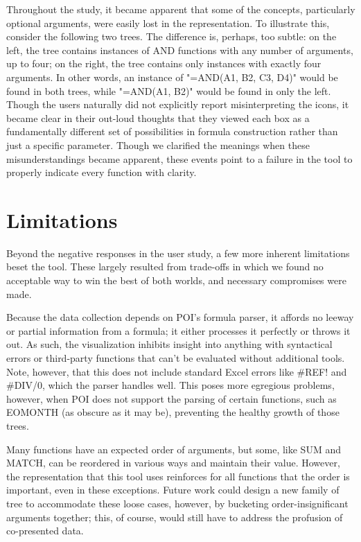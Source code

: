 \documentclass[conference]{IEEEtran}
\begin{document}
	Throughout the study, it became apparent that some of the concepts,
	particularly optional arguments, were easily lost in the representation. To
	illustrate this, consider the following two trees.	
	The difference is, perhaps, too subtle: on the left, the tree contains
	instances of AND functions with any number of arguments, up to four; on the
	right, the tree contains only instances with exactly four arguments. In other
	words, an instance of "=AND(A1, B2, C3, D4)" would be found in both trees,
	while "=AND(A1, B2)" would be found in only the left. Though the users
	naturally did not explicitly report misinterpreting the icons, it became clear
	in their out-loud thoughts that they viewed each box as a fundamentally
	different set of possibilities in formula construction rather than just a
	specific parameter. Though we clarified the meanings when these
	misunderstandings became apparent, these events point to a failure in the tool
	to properly indicate every function with clarity.   \par
		
	
	\section{Limitations} Beyond the negative responses in the user study, a few
	more inherent limitations beset the tool. These largely resulted from
	trade-offs in which we found no acceptable way to win the best of both worlds,
	and necessary compromises were made. \par
	
	Because the data collection depends on POI's formula parser, it affords no
	leeway or partial information from a formula; it either processes it perfectly
	or throws it out. As such, the visualization inhibits insight into anything
	with syntactical errors or third-party functions that can't be evaluated
	without additional tools. Note, however, that this does not include standard
	Excel errors like \#REF! and \#DIV/0, which the parser handles well. This poses
	more egregious problems, however, when POI does not support the parsing of
	certain functions, such as EOMONTH (as obscure as it may be), preventing the
	healthy growth of those trees. \par
	
	Many functions have an expected order of arguments, but some, like SUM and
	MATCH, can be reordered in various ways and maintain their value. However, the
	representation that this tool uses reinforces for all functions that the order
	is important, even in these exceptions. Future work could design a new family
	of tree to accommodate these loose cases, however, by bucketing
	order-insignificant arguments together; this, of course, would still have to
	address the profusion of co-presented data. \par
	
\end{document}
